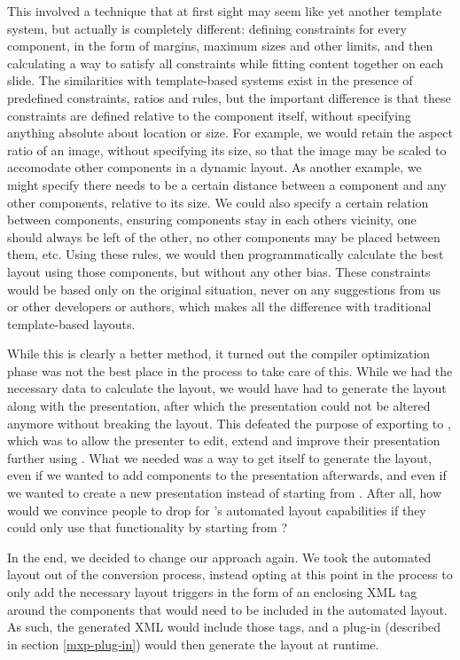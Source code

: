    This involved a technique that at first sight may seem like yet another
   template system, but actually is completely different: defining constraints
   for every component, in the form of margins, maximum sizes and other limits,
   and then calculating a way to satisfy all constraints while fitting content
   together on each slide. The similarities with template-based systems exist
   in the presence of predefined constraints, ratios and rules, but the
   important difference is that these constraints are defined relative to the
   component itself, without specifying anything absolute about location or
   size. For example, we would retain the aspect ratio of an image, without
   specifying its size, so that the image may be scaled to accomodate other
   components in a dynamic layout. As another example, we might specify there
   needs to be a certain distance between a component and any other components,
   relative to its size. We could also specify a certain relation between
   components, ensuring components stay in each others vicinity, one should
   always be left of the other, no other components may be placed between them,
   etc. Using these rules, we would then programmatically calculate the best
   layout using those components, but without any other bias. These constraints
   would be based only on the original situation, never on any suggestions from
   us or other developers or authors, which makes all the difference with
   traditional template-based layouts.
 
   While this is clearly a better method, it turned out the compiler
   optimization phase was not the best place in the process to take care of
   this. While we had the necessary data to calculate the layout, we would have
   had to generate the layout along with the \mxp presentation, after which the
   presentation could not be altered anymore without breaking the layout. This
   defeated the purpose of exporting to \mxp, which was to allow the presenter
   to edit, extend and improve their presentation further using \mxp. What we
   needed was a way to get \mxp itself to generate the layout, even if we
   wanted to add components to the presentation afterwards, and even if we
   wanted to create a new \mxp presentation instead of starting from \ppt.
   After all, how would we convince people to drop \ppt for \mxp's automated
   layout capabilities if they could only use that functionality by starting
   from \ppt?

   In the end, we decided to change our approach again. We took the automated
   layout out of the conversion process, instead opting at this point in the
   process to only add the necessary layout triggers in the form of an
   enclosing XML tag around the components that would need to be included in
   the automated layout. As such, the generated \mxp XML would include those
   tags, and a plug-in (described in section \ref{mxp-plug-in}) would then
   generate the layout at runtime.
  
